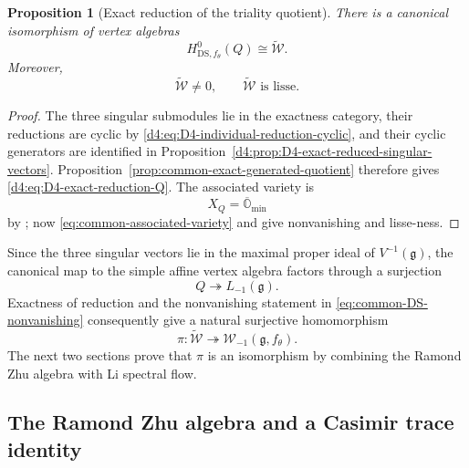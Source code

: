 \documentclass[11pt,reqno]{amsart}
\newtheorem{proposition}[theorem]{Proposition}
\theoremstyle{definition}
\theoremstyle{remark}
\begin{document}
\begin{proposition}[Exact reduction of the triality quotient]
\label{d4:prop:D4-exact-reduction-triality-quotient}
There is a canonical isomorphism of vertex algebras
\begin{equation}
  H^0_{\mathrm{DS},f_\theta}(Q)
  \cong\widetilde{\mathcal W}.
  \label{d4:eq:D4-exact-reduction-Q}
\end{equation}
Moreover,
\begin{equation}
  \widetilde{\mathcal W}\ne0,
  \qquad
  \widetilde{\mathcal W}\text{ is lisse}.
  \label{d4:eq:D4-Wtilde-nonzero-lisse}
\end{equation}
\end{proposition}

\begin{proof}
The three singular submodules lie in the exactness category, their reductions
are cyclic by \eqref{d4:eq:D4-individual-reduction-cyclic}, and their cyclic
generators are identified in
Proposition~\ref{d4:prop:D4-exact-reduced-singular-vectors}.  Proposition~\ref{prop:common-exact-generated-quotient}
therefore gives \eqref{d4:eq:D4-exact-reduction-Q}.  The associated variety is
\begin{equation*}
 X_Q=\overline{\mathbb O}_{\min}
\end{equation*}
by \cite[Proposition~5.2]{ArakawaMoreau2018}; now
\eqref{eq:common-associated-variety} and
\cite[Theorem~6.1(3)]{ArakawaMoreau2018} give nonvanishing and lisse-ness.
\end{proof}

Since the three singular vectors lie in the maximal proper ideal of
\(V^{-1}(\mathfrak g)\), the canonical map to the simple affine vertex
algebra factors through a surjection
\begin{equation*}
  Q\twoheadrightarrow L_{-1}(\mathfrak g).
\end{equation*}
Exactness of reduction and the nonvanishing statement in
\eqref{eq:common-DS-nonvanishing} consequently give a natural
surjective homomorphism
\begin{equation}
  \pi:\widetilde{\mathcal W}
  \twoheadrightarrow
  \mathcal W_{-1}(\mathfrak g,f_\theta).
  \label{d4:eq:D4-Wtilde-surjects-simple-W}
\end{equation}
The next two sections prove that \(\pi\) is an isomorphism by combining
the Ramond Zhu algebra with Li spectral flow.

\subsection{The Ramond Zhu algebra and a Casimir trace identity}
\label{d4:sec:D4-Ramond-Casimir}
\end{document}
